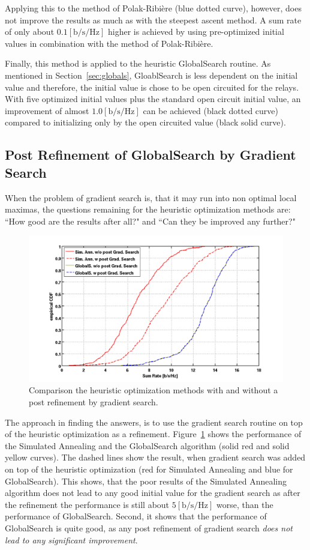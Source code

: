 Applying this to the method of Polak-Ribi\`{e}re (blue dotted curve), however, does not improve the results as much as with the steepest ascent method.
A sum rate of only about $0.1 \left[\text{b/s/Hz}\right]$ higher is achieved by using pre-optimized initial values in combination with the method of Polak-Ribi\`{e}re.

Finally, this method is applied to the heuristic GlobalSearch routine.
As mentioned in Section~\ref{sec:globals}, GloablSearch is less dependent on the initial value and therefore, the initial value is chose to be open circuited for the relays.
With five optimized initial values plus the standard open circuit initial value, an improvement of almost $1.0 \left[\text{b/s/Hz}\right]$ can be achieved (black dotted curve) compared to initializing only by the open circuited value (black solid curve).


\subsection{Post Refinement of GlobalSearch by Gradient Search}
\label{sec:postrefinement}
When the problem of gradient search is, that it may run into non optimal local maximas, the questions remaining for the heuristic optimization methods are: ``How good are the results after all?" and ``Can they be improved any further?"

\begin{figure}[h]
\centering
  \includegraphics[width=0.9\linewidth]{images/Postrefinementcomparison.png}
\caption{Comparison the heuristic optimization methods with and without a post refinement by gradient search.}
\label{fig:postrefinement}
\end{figure}

The approach in finding the answers, is to use the gradient search routine on top of the heuristic optimization as a refinement.
Figure~\ref{fig:postrefinement} shows the performance of the Simulated Annealing and the GlobalSearch algorithm (solid red and solid yellow curves).
The dashed lines show the result, when gradient search was added on top of the heuristic optimization (red for Simulated Annealing and blue for GlobalSearch).
This shows, that the poor results of the Simulated Annealing algorithm does not lead to any good initial value for the gradient search as after the refinement the performance is still about $5 \left[\text{b/s/Hz}\right]$ worse, than the performance of GlobalSearch.
Second, it shows that the performance of GlobalSearch is quite good, as any post refinement of gradient search \emph{does not lead to any significant improvement}.


